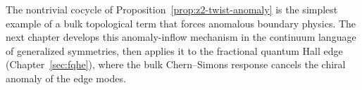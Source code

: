 \medskip

\noindent The nontrivial cocycle of Proposition~\ref{prop:z2-twist-anomaly} is the simplest example of a bulk topological term that forces anomalous boundary physics.  The next chapter develops this anomaly-inflow mechanism in the continuum language of generalized symmetries, then applies it to the fractional quantum Hall edge (Chapter~\ref{sec:fqhe}), where the bulk Chern--Simons response cancels the chiral anomaly of the edge modes.
